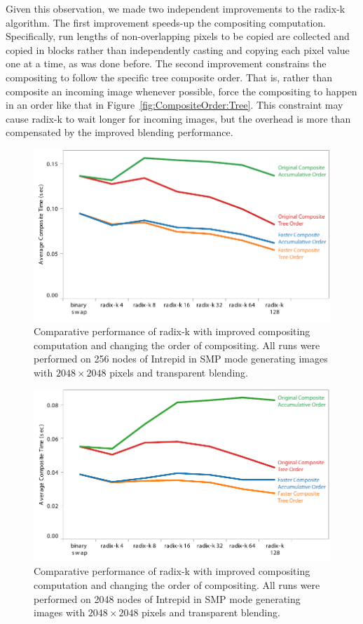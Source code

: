 \documentclass{acm_proc_article-sp}
\begin{document}
Given this observation, we made two independent improvements to the radix-k
algorithm.  The first improvement speeds-up the compositing computation.
Specifically, run lengths of non-overlapping pixels to be copied are
collected and copied in blocks rather than independently casting and
copying each pixel value one at a time, as was done before.  The second
improvement constrains the compositing to follow the specific tree
composite order.  That is, rather than composite an incoming image whenever
possible, force the compositing to happen in an order like that in
Figure~\ref{fig:CompositeOrder:Tree}.  This constraint may cause radix-k to
wait longer for incoming images, but the overhead is more than compensated
by the improved blending performance.

\begin{figure}[htbp]
  \centering
  \includegraphics[width=\linewidth]{images/CompositeImprovements0256}
  \caption{Comparative performance of radix-k with improved compositing
    computation and changing the order of compositing.  All runs were
    performed on 256 nodes of Intrepid in SMP mode generating images with
    $2048 \times 2048$ pixels and transparent blending.}
  \label{fig:IceTCompositeImprovements0256}
\end{figure}

\begin{figure}[htbp]
  \centering
  \includegraphics[width=\linewidth]{images/CompositeImprovements2048}
  \caption{Comparative performance of radix-k with improved compositing
    computation and changing the order of compositing.  All runs were
    performed on 2048 nodes of Intrepid in SMP mode generating images with
    $2048 \times 2048$ pixels and transparent blending.}
  \label{fig:IceTCompositeImprovements2048}
\end{figure}
\end{document}

